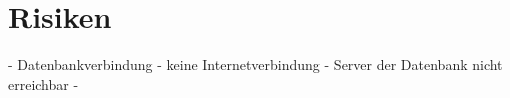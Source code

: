 \section{Risiken}
- Datenbankverbindung
	- keine Internetverbindung
	- Server der Datenbank nicht erreichbar
- 
